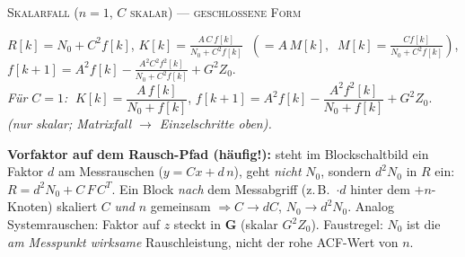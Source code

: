 {\scriptsize\scshape\color{gray!65!black} Skalarfall ($n{=}1$, $C$ skalar) — geschlossene Form}\par\nopagebreak\vspace{0.12em}
\noindent\footnotesize
$R[k]=N_0+C^2 f[k]$,\qquad
$\displaystyle K[k]=\frac{A\,C\,f[k]}{N_0+C^2 f[k]}\;\;(=A\,M[k],\;\; M[k]=\tfrac{C f[k]}{N_0+C^2 f[k]})$,\qquad
$\displaystyle f[k{+}1]=A^2 f[k]-\frac{A^2 C^2 f^2[k]}{N_0+C^2 f[k]}+G^2 Z_0$.\\[0.2em]
\emph{Für $C{=}1$:} $\;K[k]=\dfrac{A\,f[k]}{N_0+f[k]}$,\quad
$f[k{+}1]=A^2 f[k]-\dfrac{A^2 f^2[k]}{N_0+f[k]}+G^2 Z_0$.\;
\itshape (nur skalar; Matrixfall $\to$ Einzelschritte oben).\upshape\par\vspace{0.15em}
\par\vspace{0.15em}\noindent\footnotesize
\textbf{Vorfaktor auf dem Rausch-Pfad (häufig!):} steht im Blockschaltbild
ein Faktor $d$ am Messrauschen ($y{=}Cx+d\,n$), geht \emph{nicht} $N_0$, sondern
$d^2N_0$ in $R$ ein: $\boxed{R=d^2N_0+C\,F\,C^{T}}$.\;
Ein Block \emph{nach} dem Messabgriff (z.\,B.\ $\cdot d$ hinter dem $+n$-Knoten)
skaliert $C$ \emph{und} $n$ gemeinsam $\Rightarrow C\!\to\!dC$, $N_0\!\to\!d^2N_0$.\;
Analog Systemrauschen: Faktor auf $z$ steckt in $\mathbf G$ (skalar $G^2Z_0$).\;
Faustregel: $N_0$ ist die \emph{am Messpunkt wirksame} Rauschleistung, nicht der
rohe ACF-Wert von $n$.\par

\bereichende


